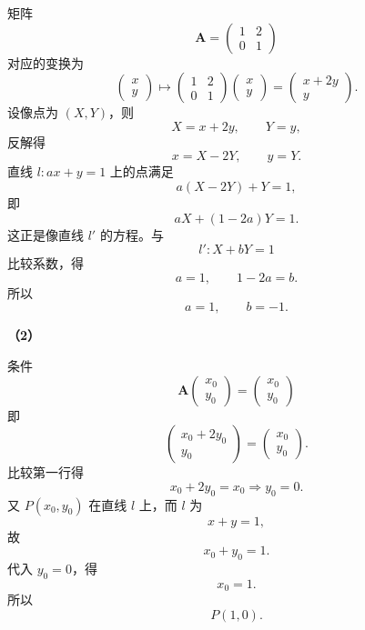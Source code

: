 \begin{answer}
矩阵
\nopagebreak[4]
\[\boldsymbol A=\begin{pmatrix}1&2\\0&1\end{pmatrix}\]
对应的变换为
\nopagebreak[4]
\[\begin{pmatrix}x\\y\end{pmatrix}\longmapsto
\begin{pmatrix}1&2\\0&1\end{pmatrix}\begin{pmatrix}x\\y\end{pmatrix}
=\begin{pmatrix}x+2y\\y\end{pmatrix}.\]
设像点为 $(X,Y)$，则
\nopagebreak[4]
\[X=x+2y,\qquad Y=y,\]
反解得
\nopagebreak[4]
\[x=X-2Y,\qquad y=Y.\]
直线 $l:ax+y=1$ 上的点满足
\nopagebreak[4]
\[a(X-2Y)+Y=1,\]
即
\nopagebreak[4]
\[aX+(1-2a)Y=1.\]
这正是像直线 $l'$ 的方程。与
\nopagebreak[4]
\[l':X+bY=1\]
比较系数，得
\nopagebreak[4]
\[a=1,\qquad 1-2a=b.\]
所以
\nopagebreak[4]
\[a=1,\qquad b=-1.\]

\textbf{（2）}

条件
\nopagebreak[4]
\[\boldsymbol A\begin{pmatrix}x_0\\y_0\end{pmatrix}=\begin{pmatrix}x_0\\y_0\end{pmatrix}\]
即
\nopagebreak[4]
\[\begin{pmatrix}x_0+2y_0\\y_0\end{pmatrix}=\begin{pmatrix}x_0\\y_0\end{pmatrix}.\]
比较第一行得
\nopagebreak[4]
\[x_0+2y_0=x_0\Longrightarrow y_0=0.\]
又 $P(x_0,y_0)$ 在直线 $l$ 上，而 $l$ 为
\nopagebreak[4]
\[x+y=1,\]
故
\nopagebreak[4]
\[x_0+y_0=1.\]
代入 $y_0=0$，得
\nopagebreak[4]
\[x_0=1.\]
所以
\nopagebreak[4]
\[P(1,0).\]


\end{answer}
